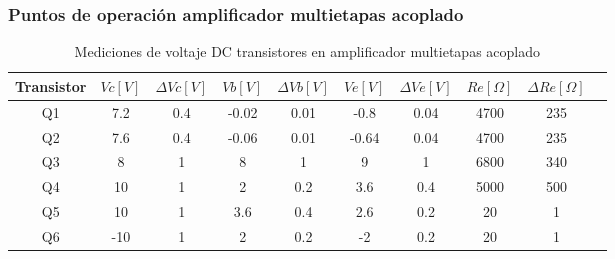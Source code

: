 \FloatBarrier
\subsubsection{Puntos de operación amplificador multietapas acoplado}

\begin{table}[h!]
\centering
\begin{tabular}{|c|c|c|c|c|c|c|c|c|c|}
\hline
\textbf{Transistor} & \textbf{\(Vc[V]\)} & \textbf{\(\varDelta Vc[V]\)} & \textbf{\(Vb[V]\)} & \textbf{\(\varDelta Vb[V]\)} & \textbf{\(Ve[V]\)} & \textbf{\(\varDelta Ve[V]\)} & \textbf{\(Re[\Omega]\)} & \textbf{\(\varDelta Re[\Omega]\)} \\ \hline
Q1 & 7.2 & 0.4 & -0.02 & 0.01 & -0.8 & 0.04 & 4700 & 235 \\ \hline
Q2 & 7.6 & 0.4 & -0.06 & 0.01 & -0.64 & 0.04 & 4700 & 235 \\ \hline
Q3 & 8 & 1 & 8 & 1 & 9 & 1 & 6800 & 340 \\ \hline
Q4 & 10 & 1 & 2 & 0.2 & 3.6 & 0.4 & 5000 & 500 \\ \hline
Q5 & 10 & 1 & 3.6 & 0.4 & 2.6 & 0.2 & 20 & 1 \\ \hline
Q6 & -10 & 1 & 2 & 0.2 & -2 & 0.2 & 20 & 1 \\ \hline
\end{tabular}
\caption{Mediciones de voltaje DC transistores en amplificador multietapas acoplado}
\label{tab:med-mediciones-voltaje-dc-transistores-amplificador-multietapas-acoplado}
\end{table}

